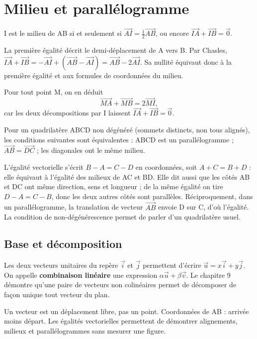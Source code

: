 \documentclass[../cours_2de.tex]{subfiles}
\begin{document}
\section{Milieu et parallélogramme}
\begin{propriete}
I est le milieu de AB si et seulement si $\overrightarrow{AI}=\frac12\overrightarrow{AB}$, ou encore $\overrightarrow{IA}+\overrightarrow{IB}=\vec0$.
\end{propriete}
\begin{demonstration}
La première égalité décrit le demi-déplacement de A vers B. Par Chasles,
$\overrightarrow{IA}+\overrightarrow{IB}
=-\overrightarrow{AI}+(\overrightarrow{AB}-\overrightarrow{AI})
=\overrightarrow{AB}-2\overrightarrow{AI}$.
Sa nullité équivaut donc à la première égalité et aux formules de coordonnées du milieu.
\end{demonstration}
Pour tout point M, on en déduit
\[
\overrightarrow{MA}+\overrightarrow{MB}
=2\overrightarrow{MI},
\]
car les deux décompositions par I laissent $\overrightarrow{IA}+\overrightarrow{IB}=\vec0$.

Pour un quadrilatère ABCD non dégénéré (sommets distincts, non tous alignés), les conditions suivantes sont équivalentes : ABCD est un parallélogramme ; $\overrightarrow{AB}=\overrightarrow{DC}$ ; les diagonales ont le même milieu.
\begin{demonstration}
L'égalité vectorielle s'écrit $B-A=C-D$ en coordonnées, soit $A+C=B+D$ : elle équivaut à l'égalité des milieux de AC et BD. Elle dit aussi que les côtés AB et DC ont même direction, sens et longueur ; de la même égalité on tire $D-A=C-B$, donc les deux autres côtés sont parallèles. Réciproquement, dans un parallélogramme, la translation de vecteur $\overrightarrow{AB}$ envoie D sur C, d'où l'égalité. La condition de non-dégénérescence permet de parler d'un quadrilatère usuel.
\end{demonstration}
\begin{finchapitre}
\section{Base et décomposition}
Les deux vecteurs unitaires du repère $\vec i$ et $\vec j$ permettent d'écrire $\vec u=x\vec i+y\vec j$. On appelle \textbf{combinaison linéaire} une expression $\alpha\vec u+\beta\vec v$. Le chapitre 9 démontre qu'une paire de vecteurs non colinéaires permet de décomposer de façon unique tout vecteur du plan.
\begin{retenir}
Un vecteur est un déplacement libre, pas un point. Coordonnées de AB : arrivée moins départ. Les égalités vectorielles permettent de démontrer alignements, milieux et parallélogrammes sans mesurer une figure.
\end{retenir}
\end{finchapitre}
\end{document}
